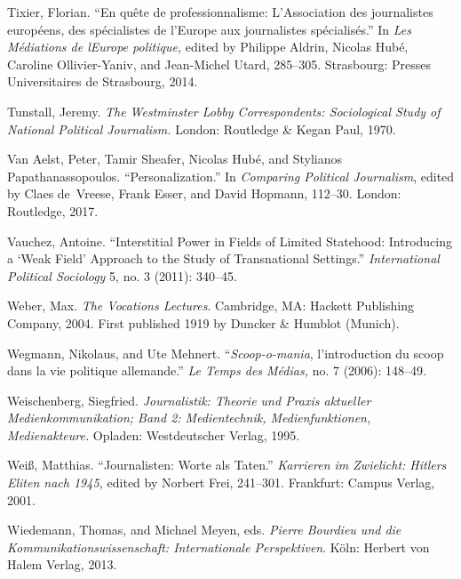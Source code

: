 \documentclass{tufte-handout}
\begin{document}
\begin{hangparas}{.25in}{1}
Tixier, Florian. ``En quête de professionnalisme: L'Association des
journalistes européens, des spécialistes de l'Europe aux journalistes
spécialisés.'' In \emph{Les Médiations de l\textquotesingle Europe
politique,} edited by Philippe Aldrin, Nicolas Hubé, Caroline
Ollivier-Yaniv, and Jean-Michel Utard, 285--305. Strasbourg: Presses
Universitaires de Strasbourg, 2014.

Tunstall, Jeremy. \emph{The Westminster Lobby Correspondents:
Sociological Study of National Political Journalism.} London: Routledge
\& Kegan Paul, 1970.

Van Aelst, Peter, Tamir Sheafer, Nicolas Hubé, and Stylianos
Papathanassopoulos. ``Personalization.'' In \emph{Comparing Political
Journalism}, edited by Claes de~Vreese, Frank Esser, and David Hopmann,
112--30. London: Routledge, 2017.

Vauchez, Antoine. ``Interstitial Power in Fields of Limited Statehood:
Introducing a `Weak Field' Approach to the Study of Transnational
Settings.'' \emph{International Political Sociology} 5, no. 3 (2011):
340--45.

Weber, Max. \emph{The Vocations Lectures}. Cambridge, MA: Hackett
Publishing Company, 2004. First published 1919 by Duncker \& Humblot
(Munich).

Wegmann, Nikolaus, and Ute Mehnert. ``\emph{Scoop-o-mania},
l'introduction du scoop dans la vie politique allemande.'' \emph{Le
Temps des Médias,} no. 7 (2006): 148--49.

Weischenberg, Siegfried. \emph{Journalistik: Theorie und Praxis
aktueller Medienkommunikation; Band 2: Medientechnik, Medienfunktionen,
Medienakteure.} Opladen: Westdeutscher Verlag, 1995.

Weiß, Matthias. ``Journalisten: Worte als Taten.'' \emph{Karrieren im
Zwielicht: Hitlers Eliten nach 1945,} edited by Norbert Frei, 241--301.
Frankfurt: Campus Verlag, 2001.

Wiedemann, Thomas, and Michael Meyen, eds. \emph{Pierre Bourdieu und die
Kommunikationswissenschaft: Internationale Perspektiven}. Köln: Herbert
von Halem Verlag, 2013.



\end{hangparas}
\end{document}

